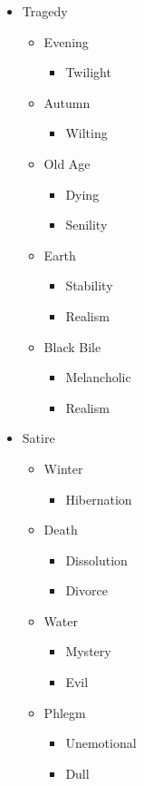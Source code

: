 \documentclass[11pt]{article}
\begin{document}
\begin{itemize}
\item Tragedy
\label{sec:orgd3c04ed}
\begin{itemize}
\item Evening
\begin{itemize}
\item Twilight
\end{itemize}
\item Autumn
\begin{itemize}
\item Wilting
\end{itemize}
\item Old Age
\begin{itemize}
\item Dying
\item Senility
\end{itemize}
\item Earth
\begin{itemize}
\item Stability
\item Realism
\end{itemize}
\item Black Bile
\begin{itemize}
\item Melancholic
\item Realism
\end{itemize}
\end{itemize}

\item Satire
\label{sec:org034fdd6}
\begin{itemize}
\item Winter
\begin{itemize}
\item Hibernation
\end{itemize}
\item Death
\begin{itemize}
\item Dissolution
\item Divorce
\end{itemize}
\item Water
\begin{itemize}
\item Mystery
\item Evil
\end{itemize}
\item Phlegm
\begin{itemize}
\item Unemotional
\item Dull
\end{itemize}
\end{itemize}
\end{itemize}
\end{document}
